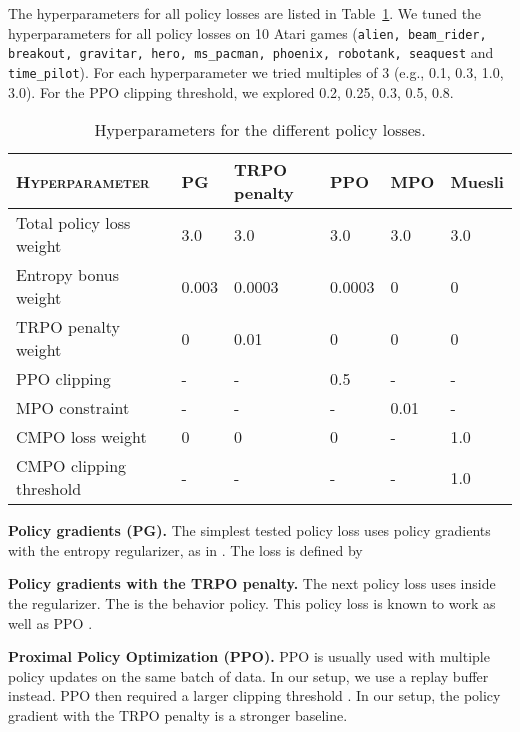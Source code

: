 \documentclass{article}
\begin{document}
The hyperparameters for all policy losses are listed in Table~\ref{tab:pg_hyperparams}. We tuned the hyperparameters for all policy losses on 10 Atari games (\texttt{alien, beam\_rider, breakout, gravitar, hero, ms\_pacman, phoenix, robotank, seaquest} and \texttt{time\_pilot}). For each hyperparameter we tried multiples of 3 (e.g., 0.1, 0.3, 1.0, 3.0). For the PPO clipping threshold, we explored 0.2, 0.25, 0.3, 0.5, 0.8.

\begin{table}[htb]
\caption{Hyperparameters for the different policy losses.}
\label{tab:pg_hyperparams}
\begin{center}
\begin{small}
\begin{tabular}{llllll}
\toprule
\textsc{Hyperparameter} & PG & TRPO penalty & PPO & MPO & Muesli \\
\midrule
  Total policy loss weight & 3.0 & 3.0 & 3.0 & 3.0 & 3.0 \\
  Entropy bonus weight & 0.003 & 0.0003 & 0.0003 & 0 & 0 \\
  TRPO penalty weight & 0 & 0.01 & 0 & 0 & 0 \\
  PPO clipping  & - & - & 0.5 & - & - \\
  MPO  constraint & - & - & - & 0.01 & - \\
  CMPO loss weight & 0 & 0 & 0 & - & 1.0 \\
  CMPO clipping threshold  & - & - & - & - & 1.0 \\
\bottomrule
\end{tabular}
\end{small}
\end{center}
\vskip -0.1in
\end{table}

\textbf{Policy gradients (PG).}
The simplest tested policy loss uses policy gradients with the entropy regularizer, as in \cite{mnih2016asynchronous}. The loss is defined by


\textbf{Policy gradients with the TRPO penalty.}
The next policy loss uses  inside the regularizer. The  is the behavior policy.
This policy loss is known to work as well as PPO \citep{cobbe2020phasic}.



\textbf{Proximal Policy Optimization (PPO).}
PPO \cite{schulman2017proximal} is usually used with multiple policy updates on the same batch of data. In our setup, we use a replay buffer instead. PPO then required a larger clipping threshold . In our setup, the policy gradient with the TRPO penalty is a stronger baseline.
\end{document}
